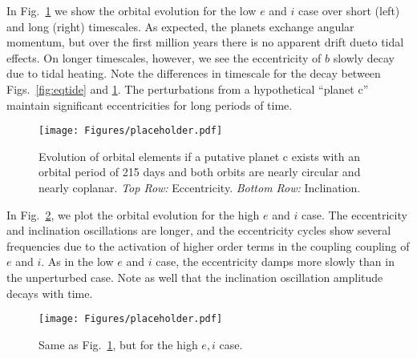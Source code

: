 \documentclass[preprint,12pt]{aastex}
\begin{document}
In Fig.~\ref{fig:MultiLow} we show the orbital evolution for the low
$e$ and $i$ case over short (left) and long (right) timescales. As
expected, the planets exchange angular momentum, but over the first
million years there is no apparent drift dueto tidal effects. On
longer timescales, however, we see the eccentricity of $b$ slowly decay
due to tidal heating. Note the differences in timescale for the decay
between Figs.~\ref{fig:eqtide} and \ref{fig:MultiLow}. The
perturbations from a hypothetical ``planet c'' maintain significant
eccentricities for long periods of time.

\begin{figure} 
\begin{center}
\texttt{[image: Figures/placeholder.pdf]}
\end{center}
\caption{Evolution of orbital elements if a putative planet c exists with an 
orbital period of 215 days and both orbits are nearly circular and nearly 
coplanar. {\it Top Row:} Eccentricity. {\it Bottom Row:} Inclination.}
\label{fig:MultiLow}
\end{figure}

In Fig.~\ref{fig:MultiHigh}, we plot the orbital evolution for the
high $e$ and $i$ case. The eccentricity and inclination oscillations
are longer, and the eccentricity cycles show several frequencies due
to the activation of higher order terms in the coupling coupling of $e$ and
$i$. As in the low $e$ and $i$ case, the eccentricity damps more
slowly than in the unperturbed case. Note as well that the inclination
oscillation amplitude decays with time.

\begin{figure} 
\begin{center}
\texttt{[image: Figures/placeholder.pdf]}
\end{center}
\caption{Same as Fig.~\ref{fig:MultiLow}, but for the high $e,i$ case.}
\label{fig:MultiHigh}
\end{figure}
\end{document}
